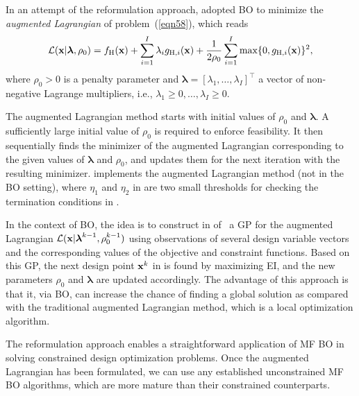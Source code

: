 \documentclass[journal ]{new-aiaa}
\begin{document}
In an attempt of the reformulation approach, \citet{Gramacy2016} adopted BO to minimize the \textit{augmented Lagrangian} of problem~(\ref{eqn58}), which reads
\begin{equation}\label{eqn63}
		\mathcal{L}({\bf x}|\boldsymbol{\lambda},\rho_0)  = f_\text{H}({\bf x}) + \sum_{i=1}^{I} \lambda_i g_{\text{H},i}({\bf x}) 
		+ \frac{1}{2 \rho_0} \sum_{i=1}^{I} \max\{0,g_{\text{H},i}({\bf x})\}^2, 
\end{equation}
where  $\rho_0>0$ is a penalty parameter and $\boldsymbol{\lambda}=[\lambda_1,\dots,\lambda_I]^\intercal$ a vector of non-negative Lagrange multipliers, i.e., $\lambda_1 \geq 0,\dots,\lambda_I \geq 0$.

The augmented Lagrangian method starts with initial values of $\rho_0$ and $\boldsymbol{\lambda}$.
A sufficiently large initial value of $\rho_0$ is required to enforce feasibility.
It then sequentially finds the minimizer of the augmented Lagrangian corresponding to the given values of $\boldsymbol{\lambda}$ and $\rho_0$, and updates them for the next iteration with the resulting minimizer.
 implements the augmented Lagrangian method (not in the BO setting), where
$\eta_1$ and $\eta_2$ in  are two small thresholds for checking the termination conditions in .    

In the context of BO, the idea is to construct in  of~ a GP for the augmented Lagrangian $\mathcal{L}({\bf x}|\boldsymbol{\lambda}^{k-1},\rho^{k-1}_0)$ using observations of several design variable vectors and the corresponding values of the objective and constraint functions.
Based on this GP, the next design point ${\bf x}^{k}$ in  is found by maximizing EI, and the new parameters $\rho_0$ and $\boldsymbol{\lambda}$ are updated accordingly.
The advantage of this approach is that it, via BO, can increase the chance of finding a global solution as compared with the traditional augmented Lagrangian method, which is a local optimization algorithm.

The reformulation approach enables a straightforward application of MF BO in solving constrained design optimization problems.
Once the augmented Lagrangian has been formulated, we can use any established unconstrained MF BO algorithms, which are more mature than their constrained counterparts.
\end{document}
